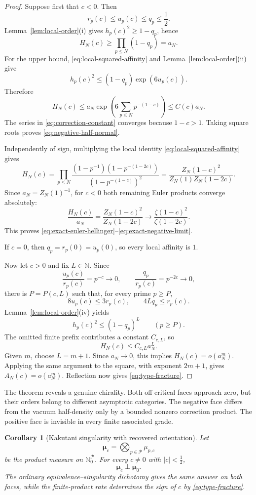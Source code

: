 \documentclass[11pt]{article}
\newtheorem{corollary}[theorem]{Corollary}
\theoremstyle{definition}
\theoremstyle{remark}
\newcommand{\N}{\mathbb N}
\newcommand{\cP}{\mathcal P}
\begin{document}
\begin{proof}
Suppose first that \(c<0\).  Then
\[
 r_p(c)\leq u_p(c)\leq q_p\leq\frac12.
\]
Lemma~\ref{lem:local-order}(i) gives \(h_p(c)^2\geq1-q_p\), hence
\[
 H_N(c)\geq\prod_{p\leq N}(1-q_p)=a_N.
\]
For the upper bound, \eqref{eq:local-squared-affinity} and
Lemma~\ref{lem:local-order}(ii) give
\[
 h_p(c)^2
 \leq(1-q_p)\exp(6u_p(c)).
\]
Therefore
\[
 H_N(c)
 \leq a_N\exp\!\left(6\sum_{p\leq N}p^{-(1-c)}\right)
 \leq C(c)a_N.
\]
The series in \eqref{eq:correction-constant} converges because \(1-c>1\).
Taking square roots proves \eqref{eq:negative-half-normal}.

Independently of sign, multiplying the local identity
\eqref{eq:local-squared-affinity} gives
\[
 H_N(c)=
 \prod_{p\leq N}
 \frac{(1-p^{-1})(1-p^{-(1-2c)})}
      {(1-p^{-(1-c)})^2}
 =
 \frac{Z_N(1-c)^2}{Z_N(1)Z_N(1-2c)}.
\]
Since \(a_N=Z_N(1)^{-1}\), for \(c<0\) both remaining Euler products converge
absolutely:
\[
 \frac{H_N(c)}{a_N}
 =\frac{Z_N(1-c)^2}{Z_N(1-2c)}
 \longrightarrow
 \frac{\zeta(1-c)^2}{\zeta(1-2c)}.
\]
This proves \eqref{eq:exact-euler-hellinger}--\eqref{eq:exact-negative-limit}.

If \(c=0\), then \(q_p=r_p(0)=u_p(0)\), so every local affinity is \(1\).

Now let \(c>0\) and fix \(L\in\N\).  Since
\[
 \frac{u_p(c)}{r_p(c)}=p^{-c}\longrightarrow0,
 \qquad
 \frac{q_p}{r_p(c)}=p^{-2c}\longrightarrow0,
\]
there is \(P=P(c,L)\) such that, for every prime \(p\geq P\),
\[
 8u_p(c)\leq3r_p(c),\qquad4Lq_p\leq r_p(c).
\]
Lemma~\ref{lem:local-order}(iv) yields
\[
 h_p(c)^2\leq(1-q_p)^L\qquad(p\geq P).
\]
The omitted finite prefix contributes a constant \(C_{c,L}\), so
\[
 H_N(c)\leq C_{c,L}a_N^L.
\]
Given \(m\), choose \(L=m+1\).  Since \(a_N\to0\), this implies
\(H_N(c)=o(a_N^m)\).  Applying the same argument to the square, with exponent
\(2m+1\), gives \(A_N(c)=o(a_N^m)\).  Reflection now gives
\eqref{eq:type-fracture}.
\end{proof}

The theorem reveals a genuine chirality.  Both off-critical faces approach zero, but their
orders belong to different asymptotic categories.  The negative face differs from the vacuum
half-density only by a bounded nonzero correction product.  The positive face is invisible in
every finite associated grade.

\begin{corollary}[Kakutani singularity with recovered orientation]\label{cor:kakutani}
Let
\[
 \boldsymbol\mu_c=\bigotimes_{p\in\cP}\mu_{p,c}
\]
be the product measure on \(\N_0^\cP\).  For every \(c\neq0\) with
\(|c|<\tfrac12\),
\[
 \boldsymbol\mu_c\perp\boldsymbol\mu_0.
 \tag{3.16}\label{eq:kakutani-singular}
\]
The ordinary equivalence--singularity dichotomy gives the same answer on both faces, while the
finite-product rate determines the sign of \(c\) by
\eqref{eq:type-fracture}.
\end{corollary}
\end{document}
